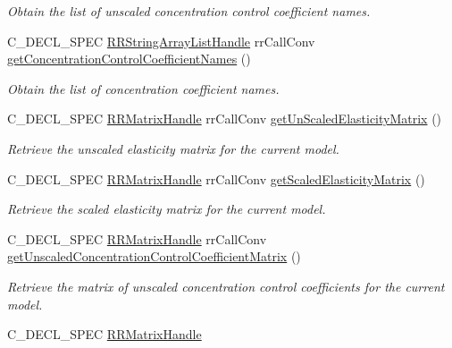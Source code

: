 \begin{DoxyCompactItemize}
\begin{DoxyCompactList}\small\item\em \-Obtain the list of unscaled concentration control coefficient names. \end{DoxyCompactList}\item 
\-C\-\_\-\-D\-E\-C\-L\-\_\-\-S\-P\-E\-C \*
\hyperlink{struct_r_r_string_array_list}{\-R\-R\-String\-Array\-List\-Handle} \*
rr\-Call\-Conv \hyperlink{group__utility_gac65874848b588a8c87ac04705eb88cbc}{get\-Concentration\-Control\-Coefficient\-Names} ()
\begin{DoxyCompactList}\small\item\em \-Obtain the list of concentration coefficient names. \end{DoxyCompactList}\item 
\-C\-\_\-\-D\-E\-C\-L\-\_\-\-S\-P\-E\-C \hyperlink{rr__c__types_8h_a87174eefa58ae98dec58c9253ae6c5da}{\-R\-R\-Matrix\-Handle} \*
rr\-Call\-Conv \hyperlink{group__utility_ga82cf39ff64eb0446c9f5a2e772283323}{get\-Un\-Scaled\-Elasticity\-Matrix} ()
\begin{DoxyCompactList}\small\item\em \-Retrieve the unscaled elasticity matrix for the current model. \end{DoxyCompactList}\item 
\-C\-\_\-\-D\-E\-C\-L\-\_\-\-S\-P\-E\-C \hyperlink{rr__c__types_8h_a87174eefa58ae98dec58c9253ae6c5da}{\-R\-R\-Matrix\-Handle} \*
rr\-Call\-Conv \hyperlink{group__utility_gaf8431784ec5c2ce1d0416606056f3d44}{get\-Scaled\-Elasticity\-Matrix} ()
\begin{DoxyCompactList}\small\item\em \-Retrieve the scaled elasticity matrix for the current model. \end{DoxyCompactList}\item 
\-C\-\_\-\-D\-E\-C\-L\-\_\-\-S\-P\-E\-C \hyperlink{rr__c__types_8h_a87174eefa58ae98dec58c9253ae6c5da}{\-R\-R\-Matrix\-Handle} \*
rr\-Call\-Conv \hyperlink{group__utility_ga418c0108d37bc4f35a55291ca85e0a3f}{get\-Unscaled\-Concentration\-Control\-Coefficient\-Matrix} ()
\begin{DoxyCompactList}\small\item\em \-Retrieve the matrix of unscaled concentration control coefficients for the current model. \end{DoxyCompactList}\item 
\-C\-\_\-\-D\-E\-C\-L\-\_\-\-S\-P\-E\-C \hyperlink{rr__c__types_8h_a87174eefa58ae98dec58c9253ae6c5da}{\-R\-R\-Matrix\-Handle} \*

\end{DoxyCompactItemize}
